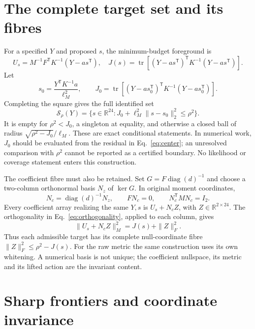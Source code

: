 \documentclass[aps,prd,onecolumn,11pt,nofootinbib,notitlepage]{revtex4-2}
\newcommand{\R}{\mathbb R}
\newcommand{\tr}{\operatorname{tr}}
\begin{document}
\section{The complete target set and its fibres}

For a specified $Y$ and proposed $s$, the minimum-budget foreground is
\begin{equation}
 U_s=M^{-1}F^{\mathsf T}K^{-1}(Y-as^{\mathsf T}),\quad
 J(s)=\tr[(Y-as^{\mathsf T})^{\mathsf T}K^{-1}(Y-as^{\mathsf T})].
 \label{eq:conditional}
\end{equation}
Let
\begin{equation}
 s_0=\frac{Y^{\mathsf T}K^{-1}a}{\ell_M^2},\qquad
 J_0=\tr[(Y-as_0^{\mathsf T})^{\mathsf T}K^{-1}(Y-as_0^{\mathsf T})].
 \label{eq:center}
\end{equation}
Completing the square gives the full identified set
\begin{equation}
 \boxed{\mathcal S_\rho(Y)=\{s\in\R^{24}:J_0+\ell_M^2\|s-s_0\|_2^2\le\rho^2\}.}
 \label{eq:set}
\end{equation}
It is empty for $\rho^2<J_0$, a singleton at equality, and otherwise a closed ball of radius $\sqrt{\rho^2-J_0}/\ell_M$. These are exact conditional statements. In numerical work, $J_0$ should be evaluated from the residual in Eq.~\eqref{eq:center}; an unresolved comparison with $\rho^2$ cannot be reported as a certified boundary. No likelihood or coverage statement enters this construction.

The coefficient fibre must also be retained. Set $G=F\operatorname{diag}(d)^{-1}$ and choose a two-column orthonormal basis $N_z$ of $\ker G$. In original moment coordinates,
\begin{equation}
 N_c=\operatorname{diag}(d)^{-1}N_z,\qquad FN_c=0,\qquad N_c^{\mathsf T}MN_c=I_2.
 \label{eq:null}
\end{equation}
Every coefficient array realizing the same $Y,s$ is $U_s+N_cZ$, with $Z\in\R^{2\times24}$. The orthogonality in Eq.~\eqref{eq:orthogonality}, applied to each column, gives
\begin{equation}
 \|U_s+N_cZ\|_M^2=J(s)+\|Z\|_F^2.
 \label{eq:fibre}
\end{equation}
Thus each admissible target has its complete null-coordinate fibre $\|Z\|_F^2\le\rho^2-J(s)$. For the raw metric the same construction uses its own whitening. A numerical basis is not unique; the coefficient nullspace, its metric and its lifted action are the invariant content.

\section{Sharp frontiers and coordinate invariance}
\end{document}
